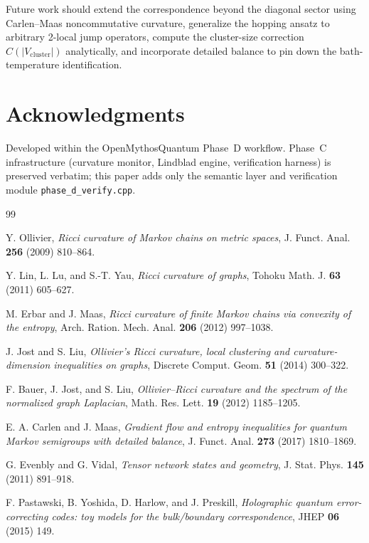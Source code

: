 \documentclass[11pt,letterpaper]{article}
\theoremstyle{definition}
\theoremstyle{remark}
\begin{document}
Future work should extend the correspondence beyond the diagonal sector
using Carlen--Maas noncommutative curvature, generalize the hopping ansatz
to arbitrary 2-local jump operators, compute the cluster-size correction
$C(|V_{\mathrm{cluster}}|)$ analytically, and incorporate detailed balance
to pin down the bath-temperature identification.

\section*{Acknowledgments}
Developed within the OpenMythosQuantum Phase~D workflow. Phase~C
infrastructure (curvature monitor, Lindblad engine, verification harness)
is preserved verbatim; this paper adds only the semantic layer and
verification module \texttt{phase\_d\_verify.cpp}.

\begin{thebibliography}{99}

 Y. Ollivier, \emph{Ricci curvature of Markov chains
on metric spaces}, J. Funct. Anal. \textbf{256} (2009) 810--864.

 Y. Lin, L. Lu, and S.-T. Yau,
\emph{Ricci curvature of graphs}, Tohoku Math. J. \textbf{63} (2011) 605--627.

 M. Erbar and J. Maas,
\emph{Ricci curvature of finite Markov chains via convexity of the entropy},
Arch. Ration. Mech. Anal. \textbf{206} (2012) 997--1038.

 J. Jost and S. Liu,
\emph{Ollivier's Ricci curvature, local clustering and curvature-dimension
inequalities on graphs}, Discrete Comput. Geom. \textbf{51} (2014) 300--322.

 F. Bauer, J. Jost, and S. Liu,
\emph{Ollivier--Ricci curvature and the spectrum of the normalized graph
Laplacian}, Math. Res. Lett. \textbf{19} (2012) 1185--1205.

 E. A. Carlen and J. Maas,
\emph{Gradient flow and entropy inequalities for quantum Markov semigroups
with detailed balance}, J. Funct. Anal. \textbf{273} (2017) 1810--1869.

 G. Evenbly and G. Vidal,
\emph{Tensor network states and geometry}, J. Stat. Phys.
\textbf{145} (2011) 891--918.

 F. Pastawski, B. Yoshida, D. Harlow, and J. Preskill,
\emph{Holographic quantum error-correcting codes: toy models for the
bulk/boundary correspondence}, JHEP \textbf{06} (2015) 149.

\end{thebibliography}
\end{document}
